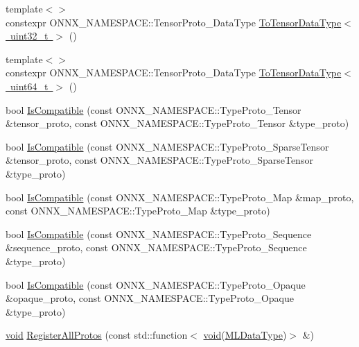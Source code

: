 \begin{DoxyCompactItemize}
\item 
{\footnotesize template$<$$>$ }\\constexpr O\+N\+N\+X\+\_\+\+N\+A\+M\+E\+S\+P\+A\+C\+E\+::\+Tensor\+Proto\+\_\+\+Data\+Type \mbox{\hyperlink{namespaceonnxruntime_1_1data__types__internal_aef5850c0443fb08be7d201ba2fc8b945}{To\+Tensor\+Data\+Type$<$ uint32\+\_\+t $>$}} ()
\item 
{\footnotesize template$<$$>$ }\\constexpr O\+N\+N\+X\+\_\+\+N\+A\+M\+E\+S\+P\+A\+C\+E\+::\+Tensor\+Proto\+\_\+\+Data\+Type \mbox{\hyperlink{namespaceonnxruntime_1_1data__types__internal_aadf5ee07a814f7fdb0db09472dbf9006}{To\+Tensor\+Data\+Type$<$ uint64\+\_\+t $>$}} ()
\item 
bool \mbox{\hyperlink{namespaceonnxruntime_1_1data__types__internal_a9099f278b70ba024c5728c05e11897ee}{Is\+Compatible}} (const O\+N\+N\+X\+\_\+\+N\+A\+M\+E\+S\+P\+A\+C\+E\+::\+Type\+Proto\+\_\+\+Tensor \&tensor\+\_\+proto, const O\+N\+N\+X\+\_\+\+N\+A\+M\+E\+S\+P\+A\+C\+E\+::\+Type\+Proto\+\_\+\+Tensor \&type\+\_\+proto)
\item 
bool \mbox{\hyperlink{namespaceonnxruntime_1_1data__types__internal_ab1bc69f6e946f482e57c5837d3f06f4a}{Is\+Compatible}} (const O\+N\+N\+X\+\_\+\+N\+A\+M\+E\+S\+P\+A\+C\+E\+::\+Type\+Proto\+\_\+\+Sparse\+Tensor \&tensor\+\_\+proto, const O\+N\+N\+X\+\_\+\+N\+A\+M\+E\+S\+P\+A\+C\+E\+::\+Type\+Proto\+\_\+\+Sparse\+Tensor \&type\+\_\+proto)
\item 
bool \mbox{\hyperlink{namespaceonnxruntime_1_1data__types__internal_aece255300cd5b81ed09517ea20130c58}{Is\+Compatible}} (const O\+N\+N\+X\+\_\+\+N\+A\+M\+E\+S\+P\+A\+C\+E\+::\+Type\+Proto\+\_\+\+Map \&map\+\_\+proto, const O\+N\+N\+X\+\_\+\+N\+A\+M\+E\+S\+P\+A\+C\+E\+::\+Type\+Proto\+\_\+\+Map \&type\+\_\+proto)
\item 
bool \mbox{\hyperlink{namespaceonnxruntime_1_1data__types__internal_a44bb8561823e33ae70b877bcd51251c8}{Is\+Compatible}} (const O\+N\+N\+X\+\_\+\+N\+A\+M\+E\+S\+P\+A\+C\+E\+::\+Type\+Proto\+\_\+\+Sequence \&sequence\+\_\+proto, const O\+N\+N\+X\+\_\+\+N\+A\+M\+E\+S\+P\+A\+C\+E\+::\+Type\+Proto\+\_\+\+Sequence \&type\+\_\+proto)
\item 
bool \mbox{\hyperlink{namespaceonnxruntime_1_1data__types__internal_a41fe7f3e42912d2e8db13d576b646120}{Is\+Compatible}} (const O\+N\+N\+X\+\_\+\+N\+A\+M\+E\+S\+P\+A\+C\+E\+::\+Type\+Proto\+\_\+\+Opaque \&opaque\+\_\+proto, const O\+N\+N\+X\+\_\+\+N\+A\+M\+E\+S\+P\+A\+C\+E\+::\+Type\+Proto\+\_\+\+Opaque \&type\+\_\+proto)
\item 
\mbox{\hyperlink{mlasi_8h_a88f941d423cb2a819b70a1358982b1a6}{void}} \mbox{\hyperlink{namespaceonnxruntime_1_1data__types__internal_ada1f3666a57810888a98209550c1cc4b}{Register\+All\+Protos}} (const std\+::function$<$ \mbox{\hyperlink{mlasi_8h_a88f941d423cb2a819b70a1358982b1a6}{void}}(\mbox{\hyperlink{namespaceonnxruntime_ad77d0a6e838ec7da5dc35fed5ee66b49}{M\+L\+Data\+Type}})$>$ \&)
\end{DoxyCompactItemize}


